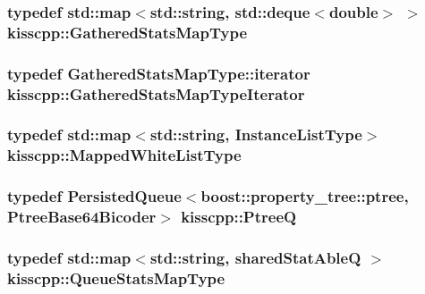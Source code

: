 \hypertarget{namespacekisscpp_a4c76f7ad5a35f6bd51154a961f9c0d7d}{
\subsubsection[{Gathered\-Stats\-Map\-Type}]{\setlength{\rightskip}{0pt plus 5cm}typedef std\-::map$<$std\-::string, std\-::deque$<$double$>$ $>$ {\bf kisscpp\-::\-Gathered\-Stats\-Map\-Type}}}\label{namespacekisscpp_a4c76f7ad5a35f6bd51154a961f9c0d7d}
\hypertarget{namespacekisscpp_a53ec1a09258369be8737e6ec2f93961c}{
\subsubsection[{Gathered\-Stats\-Map\-Type\-Iterator}]{\setlength{\rightskip}{0pt plus 5cm}typedef Gathered\-Stats\-Map\-Type\-::iterator {\bf kisscpp\-::\-Gathered\-Stats\-Map\-Type\-Iterator}}}\label{namespacekisscpp_a53ec1a09258369be8737e6ec2f93961c}
\hypertarget{namespacekisscpp_a33979b59a2b404e85c9416071d843412}{
\subsubsection[{Mapped\-White\-List\-Type}]{\setlength{\rightskip}{0pt plus 5cm}typedef std\-::map$<$std\-::string, {\bf Instance\-List\-Type}$>$ {\bf kisscpp\-::\-Mapped\-White\-List\-Type}}}\label{namespacekisscpp_a33979b59a2b404e85c9416071d843412}
\hypertarget{namespacekisscpp_af1d6724570f46ac378171bd45ddf6903}{
\subsubsection[{Ptree\-Q}]{\setlength{\rightskip}{0pt plus 5cm}typedef {\bf Persisted\-Queue}$<$boost\-::property\-\_\-tree\-::ptree, {\bf Ptree\-Base64\-Bicoder}$>$ {\bf kisscpp\-::\-Ptree\-Q}}}\label{namespacekisscpp_af1d6724570f46ac378171bd45ddf6903}
\hypertarget{namespacekisscpp_a36c7aee4be6fad3cc8ab5ec896e1f9a5}{
\subsubsection[{Queue\-Stats\-Map\-Type}]{\setlength{\rightskip}{0pt plus 5cm}typedef std\-::map$<$std\-::string, {\bf shared\-Stat\-Able\-Q} $>$ {\bf kisscpp\-::\-Queue\-Stats\-Map\-Type}}}\label{namespacekisscpp_a36c7aee4be6fad3cc8ab5ec896e1f9a5}
